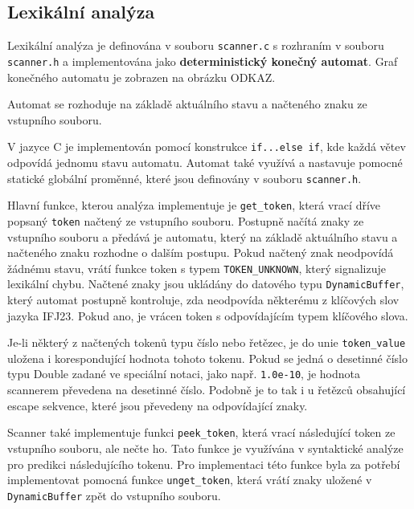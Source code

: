 \documentclass[a4paper, 11pt]{article}
\begin{document}
	\subsection{Lexikální analýza} \label{sec:lex}
	Lexikální analýza je definována v souboru \texttt{scanner.c} s rozhraním v souboru \texttt{scanner.h} a implementována jako \textbf{deterministický konečný automat}. Graf konečného automatu je zobrazen na obrázku ODKAZ.
	\par\noindent Automat se rozhoduje na základě aktuálního stavu a načteného znaku ze vstupního souboru.
	\par\noindent V jazyce C je implementován pomocí konstrukce \texttt{if...else if}, kde každá větev odpovídá jednomu stavu automatu. Automat také využívá a nastavuje pomocné statické globální proměnné, které jsou definovány v souboru \texttt{scanner.h}. 
	\par\noindent Hlavní funkce, kterou analýza implementuje je \texttt{get\_token}, která vrací dříve popsaný \texttt{token} načtený ze vstupního souboru. Postupně načítá znaky ze vstupního souboru a předává je automatu, který na základě aktuálního stavu a načteného znaku rozhodne o dalším postupu. Pokud načtený znak neodpovídá žádnému stavu, vrátí funkce token s typem \texttt{TOKEN\_UNKNOWN}, který signalizuje lexikální chybu.
	Načtené znaky jsou ukládány do datového typu \texttt{DynamicBuffer}, který automat postupně kontroluje, zda neodpovída některému z klíčových slov jazyka IFJ23. Pokud ano, je vrácen token s odpovídajícím typem klíčového slova.
	\par\noindent Je-li některý z načtených tokenů typu číslo nebo řetězec, je do unie \texttt{token\_value} uložena i korespondující hodnota tohoto tokenu. Pokud se jedná o desetinné číslo typu Double zadané ve speciální notaci, jako např. \texttt{1.0e-10}, je hodnota scannerem převedena na desetinné číslo. Podobně je to tak i u řetězců obsahující escape sekvence, které jsou převedeny na odpovídající znaky.
	\par\noindent Scanner také implementuje funkci \texttt{peek\_token}, která vrací následující token ze vstupního souboru, ale nečte ho. Tato funkce je využívána v syntaktické analýze pro predikci následujícího tokenu. Pro implementaci této funkce byla za potřebí implementovat pomocná funkce \texttt{unget\_token}, která vrátí znaky uložené v \texttt{DynamicBuffer} zpět do vstupního souboru.


	
\end{document}
